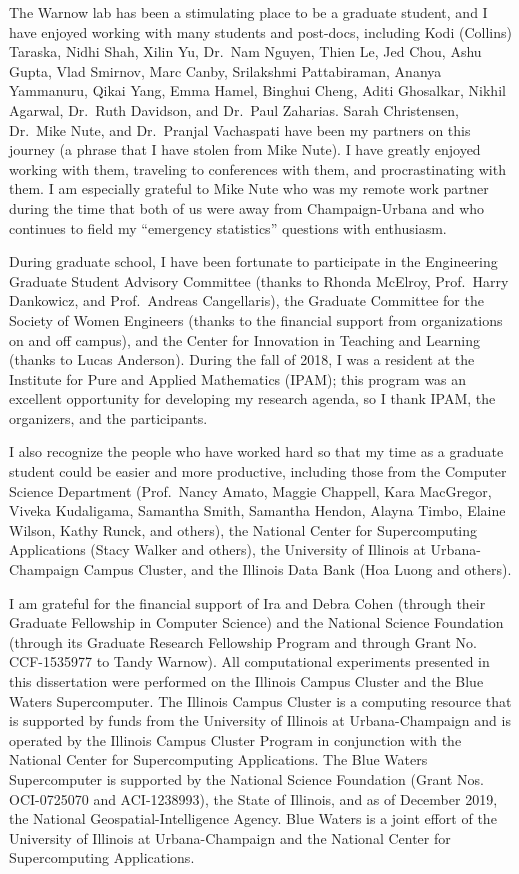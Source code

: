 \documentclass[tocnosub, noragright, centerchapter, fullpagesingle, 12pt]{uiuc_csthesis18}
\theoremstyle{definition}
\numberwithin{algocf}{chapter}     %
\begin{document}
\begin{acknowledgments}
The Warnow lab has been a stimulating place to be a graduate student, and I have enjoyed working with many students and post-docs, including Kodi (Collins) Taraska, Nidhi Shah, Xilin Yu, Dr.~Nam Nguyen, Thien Le, Jed Chou, Ashu Gupta, Vlad Smirnov, Marc Canby, Srilakshmi Pattabiraman, Ananya Yammanuru, Qikai Yang, Emma Hamel, Binghui Cheng, Aditi Ghosalkar, Nikhil Agarwal, Dr.~Ruth Davidson, and Dr.~Paul Zaharias.
Sarah Christensen, Dr.~Mike Nute, and Dr.~Pranjal Vachaspati have been my partners on this journey (a phrase that I have stolen from Mike Nute).
I have greatly enjoyed working with them, traveling to conferences with them, and procrastinating with them.
I am especially grateful to Mike Nute who was my remote work partner during the time that both of us were away from Champaign-Urbana and who continues to field my ``emergency statistics'' questions with enthusiasm.

During graduate school, I have been fortunate to participate in the Engineering Graduate Student Advisory Committee (thanks to Rhonda McElroy, Prof.~Harry Dankowicz, and Prof.~Andreas Cangellaris), the Graduate Committee for the Society of Women Engineers (thanks to the financial support from organizations on and off campus), and the Center for Innovation in Teaching and Learning (thanks to Lucas Anderson). 
During the fall of 2018, I was a resident at the Institute for Pure and Applied Mathematics (IPAM); this program was an excellent opportunity for developing my research agenda, so I thank IPAM, the organizers, and the participants.

I also recognize the people who have worked hard so that my time as a graduate student could be easier and more productive, including those from the Computer Science Department (Prof.~Nancy Amato, Maggie Chappell, Kara MacGregor, Viveka Kudaligama, Samantha Smith, Samantha Hendon, Alayna Timbo, Elaine Wilson,  Kathy Runck, and others), the National Center for Supercomputing Applications (Stacy Walker and others), the University of Illinois at Urbana-Champaign Campus Cluster, and the Illinois Data Bank (Hoa Luong and others).

I am grateful for the financial support of Ira and Debra Cohen (through their Graduate Fellowship in Computer Science) and the National Science Foundation (through its Graduate Research Fellowship Program and through Grant No. CCF-1535977 to Tandy Warnow).
All computational experiments presented in this dissertation were performed on the Illinois Campus Cluster and the Blue Waters Supercomputer.
The Illinois Campus Cluster is a computing resource that is supported by funds from the University of Illinois at Urbana-Champaign and is operated by the Illinois Campus Cluster Program in conjunction with the National Center for Supercomputing Applications.
The Blue Waters Supercomputer is supported by the National Science Foundation (Grant Nos. OCI-0725070 and ACI-1238993), the State of Illinois, and as of December 2019, the National Geospatial-Intelligence Agency. 
Blue Waters is a joint effort of the University of Illinois at Urbana-Champaign and the National Center for Supercomputing Applications.


\end{acknowledgments}
\end{document}
